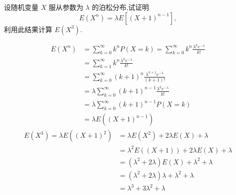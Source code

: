 \documentclass[../main.tex]{subfiles}
\begin{document}
\begin{exercise}{}{}
设随机变量 $X$ 服从参数为 $\lambda$ 的泊松分布,试证明
\[
E(X^n) = \lambda E[(X+1)^{n-1}],
\]
利用此结果计算 $E(X^3)$.
\end{exercise}
\begin{solution}
   \[
   \begin{aligned}
   E\left( X^{n} \right)&= \sum _{k= 0}^{\infty}k^{n}P\left( X= k \right)=  \sum _{k= 0}^{\infty} k^{n}\frac{ \lambda ^{k}e^{- \lambda } }{k! }  \\ 
    &= \sum _{k= 1}^{\infty}k^{n}\frac{ \lambda ^{k}e^{- \lambda } }{k! }\\ 
     &= \sum _{ k= 0}^{\infty} \left( k+ 1 \right)^{n}\frac{ \lambda ^{k+ 1}e^{- \lambda } }{\left( k+ 1 \right)!  }   \\ 
      &=  \lambda \sum _{k= 0}^{\infty}\left( k+ 1 \right)^{n-1}\frac{ \lambda ^{k}e^{- \lambda } }{k! }  \\ 
       &=  \lambda \sum _{k= 0}^{\infty}\left( k+ 1 \right)^{n-1}P\left( X= k \right)\\ 
        &=  \lambda E\left( \left( X+ 1 \right)^{n-1}  \right)    
   \end{aligned}
   \] \[
  \begin{aligned}
   E\left( X^{3} \right)= \lambda E\left( \left( X+ 1 \right)^{2}  \right)&=  \lambda  E\left( X^{2} \right)+ 2 \lambda E\left( X \right)+  \lambda  \\ 
    &=  \lambda ^{2}E\left( \left( X+ 1 \right)  \right)+ 2 \lambda E\left( X \right)+  \lambda \\ 
     &= \left(  \lambda ^{2}+ 2 \lambda  \right)E\left( X \right)+  \lambda ^{2}+  \lambda \\ 
      &= \left(  \lambda ^{2}+ 2 \lambda  \right) \lambda +  \lambda ^{2}+  \lambda \\ 
       &=  \lambda ^{3}+ 3 \lambda ^{2}+  \lambda      
  \end{aligned}   
   \]
\end{solution}
\end{document}
